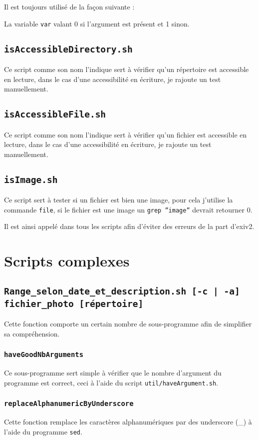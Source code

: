\documentclass[a4paper, 11pt]{article}
\begin{document}
	Il est toujours utilisé de la façon suivante : 
	
	La variable \texttt{var} valant 0 si l'argument est présent et 1 sinon.
	\subsection{\texttt{isAccessibleDirectory.sh}}
	Ce script comme son nom l'indique sert à vérifier qu'un répertoire est accessible en lecture, dans le cas d'une accessibilité en écriture, je rajoute un
	test manuellement.
	\subsection{\texttt{isAccessibleFile.sh}}
	Ce script comme son nom l'indique sert à vérifier qu'un fichier est accessible en lecture, dans le cas d'une accessibilité en écriture, je rajoute un
	test manuellement.
	\subsection{\texttt{isImage.sh}}
	Ce script sert à tester si un fichier est bien une image, pour cela j'utilise la commande \texttt{file}, si le fichier est une image un \texttt{grep
	''image''} devrait retourner 0.

	Il est ainsi appelé dans tous les scripts afin d'éviter des erreurs de la part d'exiv2.
	\section{Scripts complexes}
	\subsection{\texttt{Range\_selon\_date\_et\_description.sh [-c | -a] fichier\_photo [répertoire]}}
	Cette fonction comporte un certain nombre de sous-programme afin de simplifier sa compréhension.
	\subsubsection{\texttt{haveGoodNbArguments}}
	Ce sous-programme sert simple à vérifier que le nombre d'argument du programme est correct, ceci à l'aide du script \texttt{util/haveArgument.sh}.
	\subsubsection{\texttt{replaceAlphanumericByUnderscore}}
	Cette fonction remplace les caractères alphanumériques par des underscore (\_) à l'aide du programme \texttt{sed}.
\end{document}
